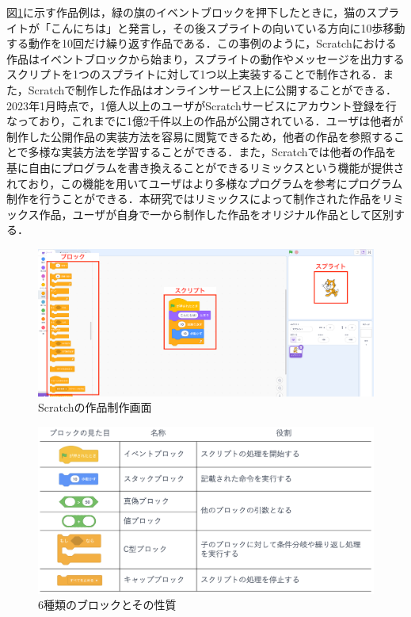 \documentclass[11pt,dvipdfmx]{jreport}
\begin{document}
図\ref{fig:scratch-description}に示す作品例は，緑の旗のイベントブロックを押下したときに，猫のスプライトが「こんにちは」と発言し，その後スプライトの向いている方向に10歩移動する動作を10回だけ繰り返す作品である．この事例のように，Scratchにおける作品はイベントブロックから始まり，スプライトの動作やメッセージを出力するスクリプトを1つのスプライトに対して1つ以上実装することで制作される．また，Scratchで制作した作品はオンラインサービス上に公開することができる．2023年1月時点で，1億人以上のユーザがScratchサービスにアカウント登録を行なっており，これまでに1億2千件以上の作品が公開されている．ユーザは他者が制作した公開作品の実装方法を容易に閲覧できるため，他者の作品を参照することで多様な実装方法を学習することができる．また，Scratchでは他者の作品を基に自由にプログラムを書き換えることができるリミックスという機能が提供されており，この機能を用いてユーザはより多様なプログラムを参考にプログラム制作を行うことができる．本研究ではリミックスによって制作された作品をリミックス作品，ユーザが自身で一から制作した作品をオリジナル作品として区別する．


\begin{figure}[t]
	\centering
	\includegraphics[width=0.9\linewidth]{Okamoto_fig/scratch-description.pdf}
	\caption{Scratchの作品制作画面}
	\label{fig:scratch-description}
\end{figure}

\begin{figure}[t]
	\centering
	\includegraphics[width=0.9\linewidth]{Okamoto_fig/blocks.pdf}
	\caption{6種類のブロックとその性質}
	\label{fig:blocks}
\end{figure}
\end{document}
